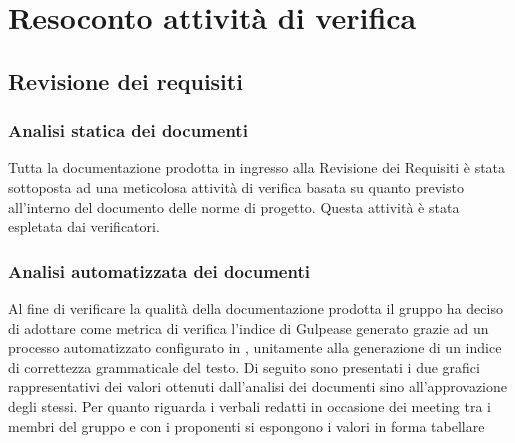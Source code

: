 \section{Resoconto attività di verifica}
\subsection{Revisione dei requisiti}
\subsubsection{Analisi statica dei documenti}
Tutta la documentazione prodotta in ingresso alla Revisione dei Requisiti è stata sottoposta ad una meticolosa attività di verifica
basata su quanto previsto all'interno del documento delle norme di progetto.
Questa attività è stata espletata dai verificatori.

\subsubsection{Analisi automatizzata dei documenti}
Al fine di verificare la qualità della documentazione prodotta il gruppo ha deciso di adottare come metrica di verifica
l'indice di Gulpease generato grazie ad un processo automatizzato configurato in \textit{}, unitamente alla generazione di un indice di 
correttezza grammaticale del testo.
Di seguito sono presentati i due grafici rappresentativi dei valori ottenuti dall'analisi dei documenti sino all'approvazione degli stessi.
Per quanto riguarda i verbali redatti in occasione dei meeting tra i membri del gruppo e con i proponenti si espongono i valori in forma tabellare


